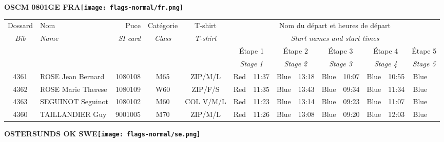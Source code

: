 \documentclass{report}
\begin{document}
\newpage
  \Huge \centering \bfseries OSCM 0801GE FRA\normalfont \footnotesize \sffamily \hfill \texttt{[image: flags-normal/fr.png]} \newline 
  \begin{longtable}{|c|l|r|c|c|*{5}{cc|}}
    Dossard & Nom  & Puce    & Catégorie & T-shirt & \multicolumn{10}{c|}{Nom du départ et heures de départ} \\
    \itshape Bib     & \itshape Name & \itshape SI card & \itshape Class  & \itshape  T-shirt  & \multicolumn{10}{c|}{\itshape Start names and start times} \\
    \hline
    & & & & & \multicolumn{2}{c|}{Étape 1} & \multicolumn{2}{c|}{Étape 2} & \multicolumn{2}{c|}{Étape 3} & \multicolumn{2}{c|}{Étape 4} & \multicolumn{2}{c|}{Étape 5} \\
    & & & & & \multicolumn{2}{c|}{\itshape Stage 1} & \multicolumn{2}{c|}{\itshape Stage 2} & \multicolumn{2}{c|}{\itshape Stage 3} & \multicolumn{2}{c|}{\itshape Stage 4} & \multicolumn{2}{c|}{\itshape Stage 5} \\
    \hline
    4361 & ROSE Jean Bernard & 1080108 & M65 & ZIP/M/L & Red & 11:37 & Blue & 13:18 & Blue & 10:07 & Blue & 10:55 & Blue &  \\
    4362 & ROSE Marie Therese & 1080109 & W60 & ZIP/F/S & Red & 11:35 & Blue & 13:43 & Blue & 09:34 & Blue & 11:34 & Blue &  \\
    4363 & SEGUINOT Seguinot & 1080102 & M60 & COL V/M/L & Red & 11:23 & Blue & 13:14 & Blue & 09:23 & Blue & 11:07 & Blue &  \\
    4360 & TAILLANDIER Guy & 9001005 & M70 & ZIP/M/L & Red & 11:26 & Blue & 13:08 & Blue & 09:20 & Blue & 12:03 & Blue &  \\
  \end{longtable}
\newpage
  \Huge \centering \bfseries OSTERSUNDS OK  SWE\normalfont \footnotesize \sffamily \hfill \texttt{[image: flags-normal/se.png]} \newline 
\end{document}
